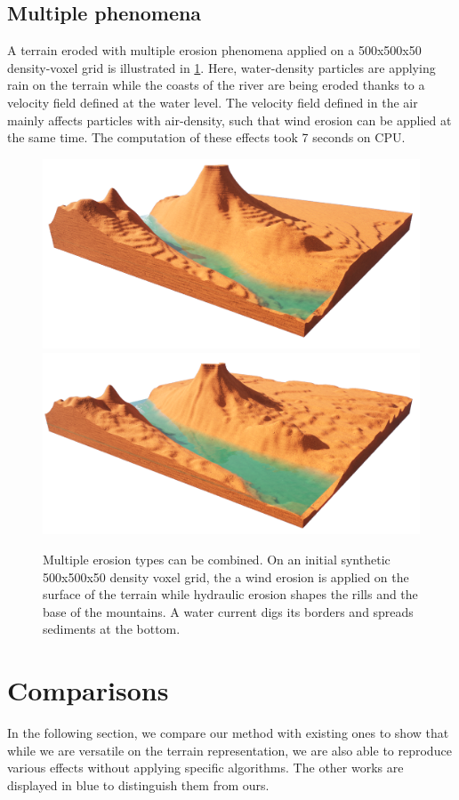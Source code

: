 \subsection{Multiple phenomena} 
A terrain eroded with multiple erosion phenomena applied on a 500x500x50 density-voxel grid is illustrated in \cref{fig:erosion_multiErosions}. Here, water-density particles are applying rain on the terrain while the coasts of the river are being eroded thanks to a velocity field defined at the water level. The velocity field defined in the air mainly affects particles with air-density, such that wind erosion can be applied at the same time. The computation of these effects took 7 seconds on CPU.

\begin{figure}[ht]
    \includegraphics[width=0.49\linewidth]{Results/MultiEffects_base.png}
    \includegraphics[width=0.49\linewidth]{Results/MultiEffects.png}
    \caption{Multiple erosion types can be combined. On an initial synthetic 500x500x50 density voxel grid, the a wind erosion is applied on the surface of the terrain while hydraulic erosion shapes the rills and the base of the mountains. A water current digs its borders and spreads sediments at the bottom. }
    \label{fig:erosion_multiErosions}
\end{figure}

\section{Comparisons}
In the following section, we compare our method with existing ones to show that while we are versatile on the terrain representation, we are also able to reproduce various effects without applying specific algorithms. The other works are displayed in blue to distinguish them from ours.

